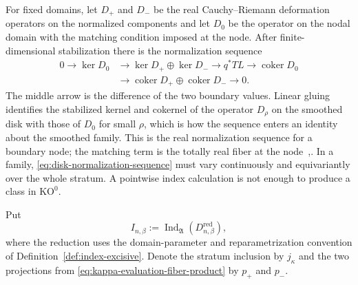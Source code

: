 \documentclass[11pt,letterpaper,twoside]{article}
\theoremstyle{plain}
\theoremstyle{definition}
\theoremstyle{remark}
\let\cite\citep
\newcommand{\Ind}{\operatorname{Ind}}
\begin{document}
For fixed domains, let \(D_+\) and \(D_-\) be the real Cauchy--Riemann deformation operators on the normalized components and let \(D_0\) be the operator on the nodal domain with the matching condition imposed at the node.  After finite-dimensional stabilization there is the normalization sequence
\begin{equation}\label{eq:disk-normalization-sequence}
\begin{aligned}
0\longrightarrow\ker D_0
&\longrightarrow \ker D_+\oplus\ker D_-
\longrightarrow q^*TL
\longrightarrow\operatorname{coker}D_0\\
&\longrightarrow\operatorname{coker}D_+\oplus
\operatorname{coker}D_-\longrightarrow0.
\end{aligned}
\end{equation}
The middle arrow is the difference of the two boundary values.  Linear gluing identifies the stabilized kernel and cokernel of the operator \(D_\rho\) on the smoothed disk with those of \(D_0\) for small \(\rho\), which is how the sequence enters an identity about the smoothed family.  This is the real normalization sequence for a boundary node; the matching term is the totally real fiber at the node~\cite[Lem.~3.1]{ekholmetnyresullivan2005},\cite{mcduffsalamon2012,wehrheimwoodward2017orientations}.  In a family, \eqref{eq:disk-normalization-sequence} must vary continuously and equivariantly over the whole stratum.  A pointwise index calculation is not enough to produce a class in \(\mathrm{KO}^0\).

Put
\[
 I_{n,\beta}:=\Ind_{\mathfrak A}(D^{\mathrm{red}}_{n,\beta}),
\]
where the reduction uses the domain-parameter and reparametrization convention of Definition~\ref{def:index-excisive}.  Denote the stratum inclusion by \(j_\kappa\) and the two projections from \eqref{eq:kappa-evaluation-fiber-product} by \(p_+\) and \(p_-\).
\end{document}
